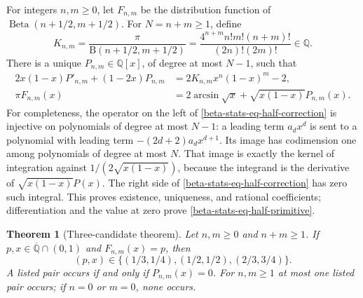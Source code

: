 \documentclass[11pt,a4paper]{article}
\newtheorem{theorem}{Theorem}[section]
\theoremstyle{definition}
\theoremstyle{remark}
\numberwithin{equation}{section}
\begin{document}
For integers $n,m\ge0$, let $F_{n,m}$ be the distribution function of
$\operatorname{Beta}(n+1/2,m+1/2)$. For $N=n+m\ge1$, define
\[
K_{n,m}=\frac{\pi}{\mathrm B(n+1/2,m+1/2)}
=\frac{4^{n+m}n!m!(n+m)!}{(2n)!(2m)!}\in\mathbb Q.
\]
There is a unique $P_{n,m}\in\mathbb Q[x]$, of degree at most $N-1$,
such that
\begin{align}
2x(1-x)P'_{n,m}+(1-2x)P_{n,m}
 &=2K_{n,m}x^n(1-x)^m-2, \label{beta-stats-eq-half-correction}\\
\pi F_{n,m}(x)
 &=2\arcsin\sqrt{x}+\sqrt{x(1-x)}P_{n,m}(x).
 \label{beta-stats-eq-half-primitive}
\end{align}
For completeness, the operator on the left of
\eqref{beta-stats-eq-half-correction} is injective on polynomials of
degree at most $N-1$: a leading term $a_dx^d$ is sent to a polynomial
with leading term $-(2d+2)a_dx^{d+1}$. Its image has codimension one
among polynomials of degree at most $N$. That image is exactly the
kernel of integration against $1/(2\sqrt{x(1-x)})$, because the
integrand is the derivative of $\sqrt{x(1-x)}P(x)$. The right side
of \eqref{beta-stats-eq-half-correction} has zero such integral.
This proves existence, uniqueness, and rational coefficients;
differentiation and the value at zero prove
\eqref{beta-stats-eq-half-primitive}.

\begin{theorem}[Three-candidate theorem]
\label{beta-stats-thm-three}
Let $n,m\ge0$ and $n+m\ge1$. If $p,x\in\overline{\mathbb Q}\cap(0,1)$
and $F_{n,m}(x)=p$, then
\[
(p,x)\in\{(1/3,1/4),(1/2,1/2),(2/3,3/4)\}.
\]
A listed pair occurs if and only if $P_{n,m}(x)=0$. For $n,m\ge1$
at most one listed pair occurs; if $n=0$ or $m=0$, none occurs.
\end{theorem}
\end{document}
